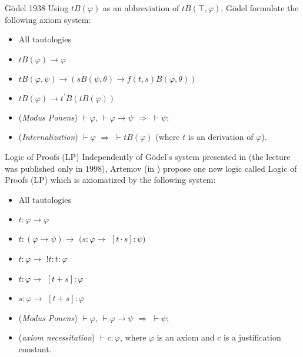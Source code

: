 \documentclass{beamer}
\theoremstyle{definition}
\newcommand{\p}{^{\prime}}
\newcommand{\impli}{\rightarrow}
\newcommand{\teo}{\vdash}
\begin{document}
\begin{frame} {Gödel 1938}
\qquad Using $tB(\varphi)$ as an abbreviation of $tB(\top,\varphi)$, Gödel formulate the following axiom system:
\vspace{5mm}
\begin{itemize}
	\item[] All tautologies
	\item[] $tB(\varphi)\impli \varphi$
	\item[] $tB(\varphi,\psi) \impli (sB(\psi,\theta) \impli f(t,s)B(\varphi,\theta))$
	\item[] $tB(\varphi) \impli t\p B(tB(\varphi))$
	\item[] (\textit{Modus Ponens}) $\teo \varphi$, $\teo \varphi\impli\psi$ $\Rightarrow$ $\teo \psi$;
	\item[] (\textit{Internalization})  $\teo \varphi$ $\Rightarrow$ $\teo tB(\varphi)$ (where $t$ is an derivation of $\varphi$).
\end{itemize}
\end{frame}



\begin{frame} {Logic of Proofs (LP)}
\qquad Independently of Gödel's system presented in \cite{Goedel38} (the lecture was published only in 1998), Artemov (in \cite{Artemov01}) propose one new logic called {\color{blue}Logic of Proofs (LP)} which is axiomatized by the following system:     

\begin{itemize}
	\item[] All tautologies
	\item[] $t$$:$$\varphi \impli \varphi$
	\item[] $t$$:$$(\varphi \impli \psi) \impli$ $(s$$:$$\varphi \impli$ $[t\cdot s]$$:$$\psi)$
	\item[] $t$$:$$\varphi \impli$ $!t$$:$$t$$:$$\varphi$
	\item[] $t$$:$$\varphi \impli$ $[t+s]$$:$$\varphi$ 
	\item[] $s$$:$$\varphi \impli$ $[t+s]$$:$$\varphi$
	\item[] (\textit{Modus Ponens}) $\teo \varphi$, $\teo \varphi\impli\psi$ $\Rightarrow$ $\teo \psi$;
	\item[] (\textit{axiom necessitation})  $\teo c$$:$$\varphi$, where $\varphi$ is an axiom and $c$ is a justification constant.
\end{itemize}
\end{frame}
\end{document}
